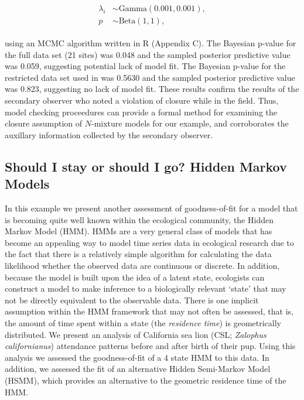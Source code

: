 \documentclass[12pt,english]{article}
\begin{document}
\begin{spacing}{1.9}
\begin{linenomath}
\begin{align}
\begin{split}
          \lambda_i & \sim
          \text{Gamma}(0.001,0.001), \\
          p & \sim \text{Beta}(1,1),
        \end{split}
              \label{eq:nmix2}
      \end{align}
    \end{linenomath}
    using an MCMC algorithm written in R (Appendix C). The Bayesian
    p-value for the full data set (21 sites) was 0.048 and the sampled
    posterior predictive value was 0.059, suggesting
    potential lack
    of model fit. The Bayesian p-value for the restricted data set
    used in \citet{williams2017estimating} was 0.5630 and the sampled
    posterior predictive value was 0.823, suggesting no
    lack of model fit. These results confirm the results of the secondary
    observer who noted a violation of closure while in the
    field. Thus, model checking proceedures can provide a formal method for
    examining the closure assumption of $N$-mixture models for our
    example, and corroborates the auxillary information collected by
    the secondary observer.

    \subsection{Should I stay or should I go? Hidden Markov Models}
    
    In this example we present another assessment of goodness-of-fit for a model that is becoming quite well known within the ecological community, the Hidden Markov Model (HMM). HMMs are a very general class of models that has become an appealing way to model time series data in ecological research due to the fact that there is a relatively simple algorithm for calculating the data likelihood whether the observed data are continuous or discrete. In addition, because the model is built upon the idea of a latent state, ecologists can construct a model to make inference to a biologically relevant `state' that may not be directly equivalent to the observable data. There is one implicit assumption within the HMM framework that may not often be assessed, that is, the amount of time spent within a state (the {\it residence time}) is geometrically distributed. We present an analysis of California sea lion (CSL; {\it Zalophus californianus}) attendance patterns before and after birth of their pup. Using this analysis we assessed the goodness-of-fit of a 4 state HMM to this data. In addition, we assessed the fit of an alternative Hidden Semi-Markov Model (HSMM), which provides an alternative to the geometric residence time of the HMM.
    

\end{spacing}
\end{document}

